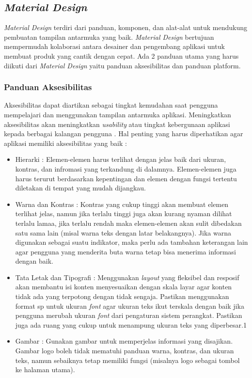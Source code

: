 \subsection{\textit{Material Design}}
\textit{Material Design} terdiri dari panduan, komponen, dan alat-alat untuk mendukung pembuatan tampilan antarmuka yang baik. \textit{Material Design} bertujuan mempermudah kolaborasi antara desainer dan pengembang aplikasi untuk membuat produk yang cantik dengan cepat\cite{materialdesign}. Ada 2 panduan utama yang harus diikuti dari \textit{Material Design} yaitu panduan aksesibilitas dan panduan platform. 

\subsubsection{Panduan Aksesibilitas}
Aksesibilitas dapat diartikan sebagai tingkat kemudahan saat pengguna mempelajari dan menggunakan tampilan antarmuka aplikasi. Meningkatkan aksesibilitas akan meningkatkan \textit{usability} atau tingkat kebergunaan aplikasi kepada berbagai kalangan pengguna \cite{materialdesign}. Hal penting yang harus diperhatikan agar aplikasi memiliki aksesibilitas yang baik :
\begin{itemize}
    \item Hierarki : Elemen-elemen harus terlihat dengan jelas baik dari ukuran, kontras, dan infromasi yang terkandung di dalamnya. Elemen-elemen juga harus terurut berdasarkan kepentingan dan elemen dengan fungsi tertentu diletakan di tempat yang mudah dijangkau.
    \item Warna dan Kontras : Kontras yang cukup tinggi akan membuat elemen terlihat jelas, namun jika terlalu tinggi juga akan kurang nyaman dilihat terlalu lamaa, jika terlalu rendah maka elemen-elemen akan sulit dibedakan satu sama lain (misal warna teks dengan latar belakangnya). Jika warna digunakan sebagai suatu indikator, maka perlu ada tambahan keterangan lain agar pengguna yang menderita buta warna tetap bisa menerima informasi dengan baik.
    \item Tata Letak dan Tipografi : Menggunakan \textit{layout} yang fleksibel dan resposif akan membantu isi konten menyesuaikan dengan skala layar agar konten tidak ada yang terpotong dengan tidak sengaja. Pastikan menggunakan format sp untuk ukuran \textit{font} agar ukuran teks ikut terskala dengan baik jika pengguna merubah ukuran \textit{font} dari pengaturan sistem perangkat. Pastikan juga ada ruang yang cukup untuk menampung ukuran teks yang diperbesar.1 
    \item Gambar : Gunakan gambar untuk memperjelas informasi yang disajikan. Gambar logo boleh tidak mematuhi panduan warna, kontras, dan ukuran teks, namun sebaiknya tetap memiliki fungsi (misalnya logo sebagai tombol ke halaman utama).  
\end{itemize}

